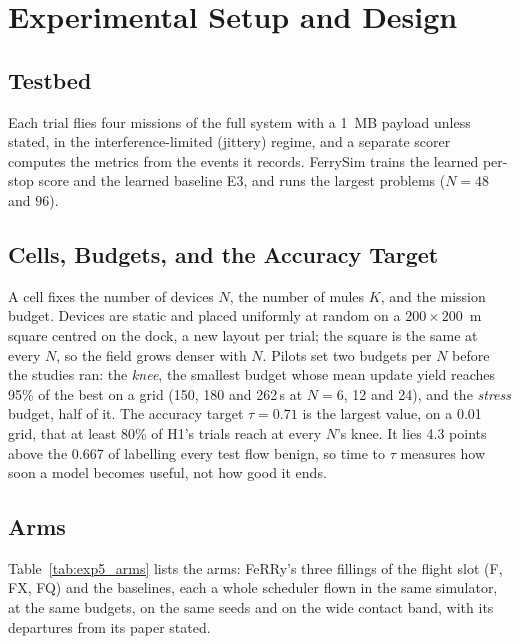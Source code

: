 \documentclass[conference]{IEEEtran}
\newcommand{\sysname}{FeRRy}
\begin{document}
\section{Experimental Setup and Design}
\label{sec:setup}

\subsection{Testbed}
\label{sec:setup:testbed}

Each trial flies four missions of the full system with a 1~MB payload unless
stated, in the
interference-limited (jittery) regime, and a separate scorer computes the
metrics from the events it records. FerrySim trains the learned per-stop score
and the learned baseline E3, and runs the largest problems ($N=48$ and $96$).

\subsection{Cells, Budgets, and the Accuracy Target}
\label{sec:setup:cells}

A cell fixes the number of devices $N$, the number of mules $K$, and the mission
budget. Devices are static and placed uniformly at random on a $200\times200$~m
square centred on the dock, a new layout per trial; the square is the same at
every $N$, so the field grows denser with $N$. Pilots set two budgets per $N$
before the studies ran: the \emph{knee}, the smallest budget whose mean update
yield reaches 95\% of the best on a grid (150, 180 and 262\,s at $N=6$, 12 and
24), and the \emph{stress} budget, half of it. The accuracy target $\tau=0.71$
is the largest value, on a 0.01 grid, that at least 80\% of H1's trials reach at
every $N$'s knee. It lies 4.3 points above the 0.667 of labelling every test flow
benign, so time to $\tau$ measures how soon a model becomes useful, not how good
it ends.

\subsection{Arms}
\label{sec:setup:arms}

Table~\ref{tab:exp5_arms} lists the arms: \sysname{}'s three fillings of the
flight slot (F, FX, FQ) and the baselines, each a whole scheduler flown in the
same simulator, at the same budgets, on the same seeds and on the wide contact
band, with its departures from its paper stated.
\end{document}

